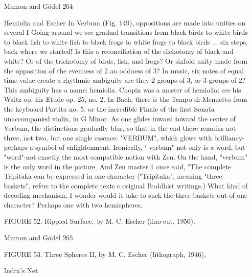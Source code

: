 Mumon and Gödel                                                                        264

                               Hemiolia and Escher
In Verbum (Fig. 149), oppositions are made into unities on several I Going around we see
gradual transitions from black birds to white birds to black fish to white fish to black
frogs to white frogs to black birds ... six steps, back where we started! Is this a
reconciliation of the dichotomy of black and white? Or of the trichotomy of birds, fish,
and frogs? Or sixfold unity made from the opposition of the evenness of 2 an oddness of
3? In music, six notes of equal time value create a rhythmic ambiguity-are they 2 groups
of 3, or 3 groups of 2? This ambiguity has a name: hemiolia. Chopin was a master of
hemiolia: see his Waltz op. his Etude op. 25, no. 2. In Bach, there is the Tempo di
Menuetto from the keyboard Partita no. 5, or the incredible Finale of the first Sonata
unaccompanied violin, in G Minor.
        As one glides inward toward the center of Verbum, the distinctions gradually blur,
so that in the end there remains not three, not two, but one single essence: "VERBUM",
which glows with brilliancy-perhaps a symbol of enlightenment. Ironically, ` verbum"
not only is a word, but "word"-not exactly the most compatible notion with Zen. On the
hand, "verbum" is the only word in the picture. And Zen master 1 once said, "The
complete Tripitaka can be expressed in one character ("Tripitaka", meaning "three
baskets", refers to the complete texts c original Buddhist writings.) What kind of
decoding-mechanism, I wonder would it take to suck the three baskets out of one
character? Perhaps one with two hemispheres.


            FIGURE 52. Rippled Surface, by M. C. Escher (lino-cut, 1950).




Mumon and Gödel                                                                       265

           FIGURE 53. Three Spheres II, by M. C. Escher (lithograph, 1946),

                                       Indra's Net

